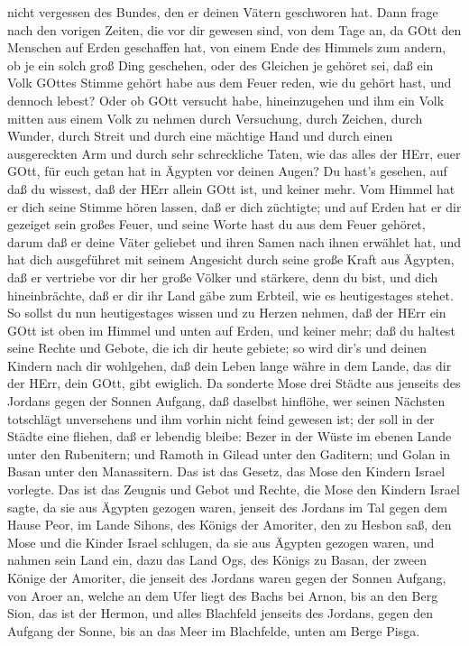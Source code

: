 nicht vergessen des Bundes, den er deinen Vätern geschworen hat.
 Dann frage nach den vorigen Zeiten, die vor dir gewesen
sind, von dem Tage an, da GOtt den Menschen auf Erden geschaffen hat,
von einem Ende des Himmels zum andern, ob je ein solch groß Ding
geschehen, oder des Gleichen je gehöret sei,  daß ein Volk
GOttes Stimme gehört habe aus dem Feuer reden, wie du gehört hast, und
dennoch lebest?  Oder ob GOtt versucht habe, hineinzugehen
und ihm ein Volk mitten aus einem Volk zu nehmen durch Versuchung, durch
Zeichen, durch Wunder, durch Streit und durch eine mächtige Hand und
durch einen ausgereckten Arm und durch sehr schreckliche Taten, wie das
alles der HErr, euer GOtt, für euch getan hat in Ägypten vor deinen
Augen?  Du hast's gesehen, auf daß du wissest, daß der HErr
allein GOtt ist, und keiner mehr.  Vom Himmel hat er dich
seine Stimme hören lassen, daß er dich züchtigte; und auf Erden hat er
dir gezeiget sein großes Feuer, und seine Worte hast du aus dem Feuer
gehöret,  darum daß er deine Väter geliebet und ihren Samen
nach ihnen erwählet hat, und hat dich ausgeführet mit seinem Angesicht
durch seine große Kraft aus Ägypten,  daß er vertriebe vor
dir her große Völker und stärkere, denn du bist, und dich hineinbrächte,
daß er dir ihr Land gäbe zum Erbteil, wie es heutigestages stehet.
 So sollst du nun heutigestages wissen und zu Herzen
nehmen, daß der HErr ein GOtt ist oben im Himmel und unten auf Erden,
und keiner mehr;  daß du haltest seine Rechte und Gebote,
die ich dir heute gebiete; so wird dir's und deinen Kindern nach dir
wohlgehen, daß dein Leben lange währe in dem Lande, das dir der HErr,
dein GOtt, gibt ewiglich.  Da sonderte Mose drei Städte aus
jenseits des Jordans gegen der Sonnen Aufgang,  daß
daselbst hinflöhe, wer seinen Nächsten totschlägt unversehens und ihm
vorhin nicht feind gewesen ist; der soll in der Städte eine fliehen, daß
er lebendig bleibe:  Bezer in der Wüste im ebenen Lande
unter den Rubenitern; und Ramoth in Gilead unter den Gaditern; und Golan
in Basan unter den Manassitern.  Das ist das Gesetz, das
Mose den Kindern Israel vorlegte.  Das ist das Zeugnis und
Gebot und Rechte, die Mose den Kindern Israel sagte, da sie aus Ägypten
gezogen waren,  jenseit des Jordans im Tal gegen dem Hause
Peor, im Lande Sihons, des Königs der Amoriter, den zu Hesbon saß, den
Mose und die Kinder Israel schlugen, da sie aus Ägypten gezogen waren,
 und nahmen sein Land ein, dazu das Land Ogs, des Königs zu
Basan, der zween Könige der Amoriter, die jenseit des Jordans waren
gegen der Sonnen Aufgang,  von Aroer an, welche an dem Ufer
liegt des Bachs bei Arnon, bis an den Berg Sion, das ist der Hermon,
 und alles Blachfeld jenseits des Jordans, gegen den
Aufgang der Sonne, bis an das Meer im Blachfelde, unten am Berge Pisga.

